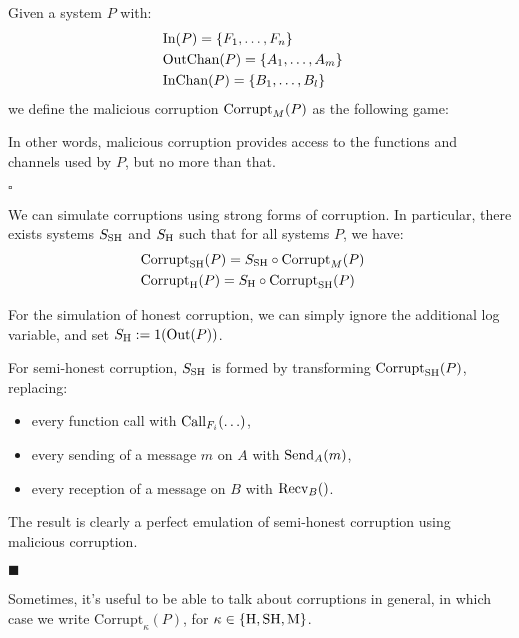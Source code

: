 \begin{definition}
Given a system $P$ with:
$$
\begin{aligned}
  &\text{In}(P) = \{F_1, \ldots, F_n\}\cr
  &\text{OutChan}(P) = \{A_1, \ldots, A_m\}\cr
  &\text{InChan}(P) = \{B_1, \ldots, B_l\}\cr
\end{aligned}
$$
we define the malicious corruption $\text{Corrupt}_M(P)$ as the following game:

In other words, malicious corruption provides access to the functions
and channels used by $P$, but no more than that.

$\square$
\end{definition}

\begin{lemma}
  We can simulate corruptions using strong forms of corruption.
  In particular, there exists systems $S_{\text{SH}}$ and $S_{\text{H}}$ such that
  for all systems $P$, we have:
  \[
    \begin{aligned}
      &\text{Corrupt}_{\text{SH}}(P) = S_{\text{SH}} \circ \text{Corrupt}_M(P)\cr
      &\text{Corrupt}_{\text{H}}(P) = S_{\text{H}} \circ \text{Corrupt}_{\text{SH}}(P)
    \end{aligned}
  \]

For the simulation of honest corruption, we can simply ignore
  the additional log variable, and set $S_{\text{H}} := 1(\text{Out}(P))$.

For semi-honest corruption, $S_{\text{SH}}$ is formed by transforming
$\text{Corrupt}_{\text{SH}}(P)$, replacing:
\begin{itemize}
  \item every function call with $\text{Call}_{F_i}(\ldots)$,
  \item every sending of a message $m$ on $A$ with $\text{Send}_A(m)$,
  \item every reception of a message on $B$ with $\text{Recv}_B()$.
\end{itemize}
The result is clearly a perfect emulation of semi-honest corruption
using malicious corruption.

$\blacksquare$
\end{lemma}

Sometimes, it's useful to be able to talk about corruptions in general,
in which case we write $\text{Corrupt}_\kappa(P)$,
for $\kappa \in \{\text{H}, \text{SH}, \text{M}\}$.

